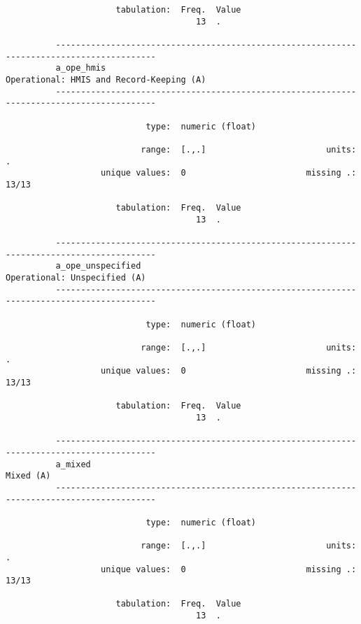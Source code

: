 \documentclass{article}
\begin{document}
\begin{verbatim}
                      tabulation:  Freq.  Value
                                      13  .
          
          ------------------------------------------------------------------------------------------
          a_ope_hmis                                        Operational: HMIS and Record-Keeping (A)
          ------------------------------------------------------------------------------------------
          
                            type:  numeric (float)
          
                           range:  [.,.]                        units:  .
                   unique values:  0                        missing .:  13/13
          
                      tabulation:  Freq.  Value
                                      13  .
          
          ------------------------------------------------------------------------------------------
          a_ope_unspecified                                             Operational: Unspecified (A)
          ------------------------------------------------------------------------------------------
          
                            type:  numeric (float)
          
                           range:  [.,.]                        units:  .
                   unique values:  0                        missing .:  13/13
          
                      tabulation:  Freq.  Value
                                      13  .
          
          ------------------------------------------------------------------------------------------
          a_mixed                                                                          Mixed (A)
          ------------------------------------------------------------------------------------------
          
                            type:  numeric (float)
          
                           range:  [.,.]                        units:  .
                   unique values:  0                        missing .:  13/13
          
                      tabulation:  Freq.  Value
                                      13  .
          
          
          
          
          
          
\end{verbatim}
\end{document}
